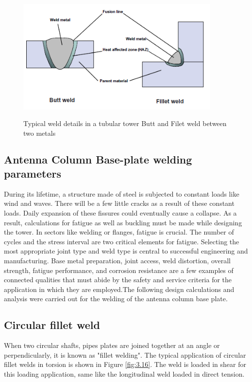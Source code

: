 {\begin{figure}[htp]
    \centering
    \includegraphics[width=4in]{Figures/Terminology_welding.png}
    \caption{Typical weld details in a tubular tower Butt and Filet weld between two metals}
    \cite{steel_2016}
    \label{fig:3.14}
\end{figure}

\subsection{Antenna Column Base-plate welding parameters}
During its lifetime, a structure made of steel is subjected to constant loads like wind and waves. There will be a few little cracks as a result of these constant loads. Daily expansion of these fissures could eventually cause a collapse. As a result, calculations for fatigue as well as buckling must be made while designing the tower. In sectors like welding or flanges, fatigue is crucial. The number of cycles and the stress interval are two critical elements for fatigue. Selecting the most appropriate joint type and weld type is central to successful engineering and manufacturing. Base metal preparation, joint access, weld distortion, overall strength, fatigue performance, and corrosion resistance are a few examples of connected qualities that must abide by the safety and service criteria for the application in which they are employed.The following design calculations and analysis were carried out for the welding of the antenna column base plate.


\subsection{Circular fillet weld}
When two circular shafts, pipes plates are joined together at an angle or perpendicularly, it is known as "fillet welding". The typical application of circular fillet welds in torsion is shown in Figure \ref{fig:3.16}. The weld is loaded in shear for this loading application, same like the longitudinal weld loaded in direct tension.



}
